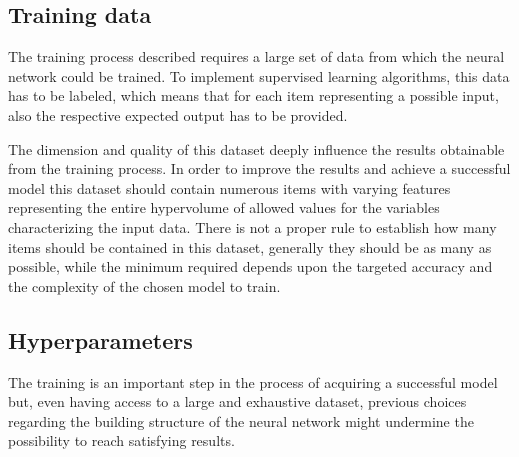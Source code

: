 \documentclass[a4paper,10pt]{report}
\begin{document}
\subsection{Training data}

The training process described requires a large set of data from which 
the neural network could be trained.
To implement supervised learning algorithms, this data has to be labeled, which means that
for each item representing a possible input, also the respective 
expected output has to be provided.


The dimension and quality of this 
dataset deeply influence the results obtainable from the training process.
In order to improve the results and achieve a successful model 
this dataset should contain numerous items with varying features
representing the entire hypervolume of allowed values for the variables
characterizing the input data.
There is not a proper rule to establish how many items should be contained 
in this dataset, generally they should be as many as possible, while 
the minimum required depends upon the targeted accuracy and the complexity of
the chosen model to train.


\subsection{Hyperparameters}

The training is an important step in the process of acquiring a successful model but, even
having access to a large and exhaustive dataset, previous choices regarding the 
building structure of the neural network might undermine the possibility to reach
satisfying results.
\end{document}
